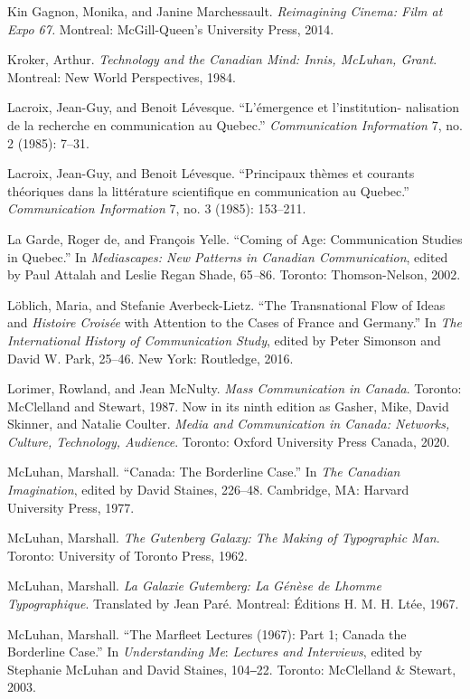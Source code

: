 \documentclass{tufte-handout}
\begin{document}
\begin{hangparas}{.25in}{1}
Kin Gagnon, Monika, and Janine Marchessault. \emph{Reimagining Cinema:
Film at Expo 67.} Montreal: McGill-Queen's University Press, 2014.

Kroker, Arthur. \emph{Technology and the Canadian Mind: Innis, McLuhan,
Grant}. Montreal: New World Perspectives, 1984.

Lacroix, Jean-Guy, and Benoit Lévesque. ``L'émergence et
l'institution- nalisation de la recherche en communication au Quebec.''
\emph{Communication Information} 7, no. 2 (1985): 7--31.

Lacroix, Jean-Guy, and Benoit Lévesque. ``Principaux thèmes et courants
théoriques dans la littérature scientifique en communication au
Quebec.'' \emph{Communication Information} 7, no. 3 (1985): 153--211.

La Garde, Roger de, and François Yelle. ``Coming of Age: Communication
Studies in Quebec.'' In \emph{Mediascapes: New Patterns in Canadian
Communication}, edited by Paul Attalah and Leslie Regan Shade,
65\emph{--}86. Toronto: Thomson-Nelson, 2002.

Löblich, Maria, and Stefanie Averbeck-Lietz. ``The Transnational Flow of
Ideas and \emph{Histoire Croisée} with Attention to the Cases of France
and Germany.'' In \emph{The International History of Communication
Study}, edited by Peter Simonson and David W. Park, 25--46. New York:
Routledge, 2016.

Lorimer, Rowland, and Jean McNulty. \emph{Mass Communication in Canada}.
Toronto: McClelland and Stewart, 1987. Now in its ninth edition as
Gasher, Mike, David Skinner, and Natalie Coulter. \emph{Media and
Communication in Canada: Networks, Culture, Technology, Audience}.
Toronto: Oxford University Press Canada, 2020.

McLuhan, Marshall. ``Canada: The Borderline Case.'' In \emph{The
Canadian Imagination}, edited by David Staines, 226--48. Cambridge, MA:
Harvard University Press, 1977.

McLuhan, Marshall. \emph{The Gutenberg Galaxy: The Making of Typographic
Man}. Toronto: University of Toronto Press, 1962.

McLuhan, Marshall. \emph{La Galaxie Gutemberg: La Génèse de
L\textquotesingle homme Typographique}. Translated by Jean Paré.
Montreal: Éditions H. M. H. Ltée, 1967.

McLuhan, Marshall. ``The Marfleet Lectures (1967): Part 1; Canada the
Borderline Case.'' In \emph{Understanding Me}: \emph{Lectures and
Interviews}, edited by Stephanie McLuhan and David Staines, 104‒22.
Toronto: McClelland \& Stewart, 2003.


\end{hangparas}
\end{document}
